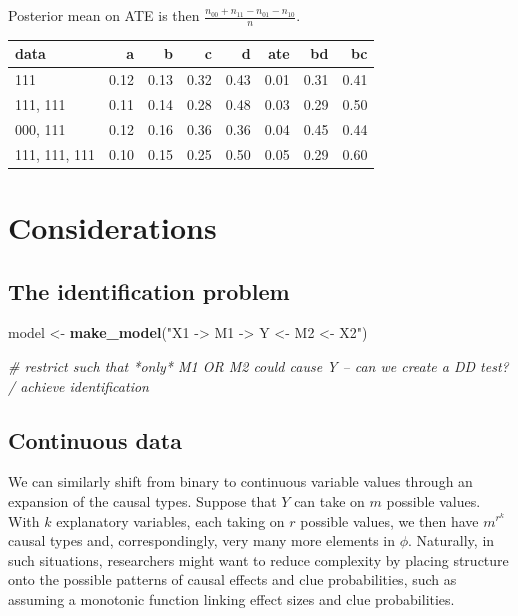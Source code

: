 \documentclass[
  12pt,
]{book}
\newenvironment{Shaded}{\begin{snugshade}}{\end{snugshade}}
\newcommand{\CommentTok}[1]{\textcolor[rgb]{0.56,0.35,0.01}{\textit{#1}}}
\newcommand{\KeywordTok}[1]{\textcolor[rgb]{0.13,0.29,0.53}{\textbf{#1}}}
\newcommand{\NormalTok}[1]{#1}
\newcommand{\StringTok}[1]{\textcolor[rgb]{0.31,0.60,0.02}{#1}}
\begin{document}
Posterior mean on ATE is then \(\frac{n_{00} + n_{11} - n_{01} - n_{10}}n\).

\begin{tabular}{l|r|r|r|r|r|r|r}
\hline
data & a & b & c & d & ate & bd & bc\\
\hline
111 & 0.12 & 0.13 & 0.32 & 0.43 & 0.01 & 0.31 & 0.41\\
\hline
111, 111 & 0.11 & 0.14 & 0.28 & 0.48 & 0.03 & 0.29 & 0.50\\
\hline
000, 111 & 0.12 & 0.16 & 0.36 & 0.36 & 0.04 & 0.45 & 0.44\\
\hline
111, 111, 111 & 0.10 & 0.15 & 0.25 & 0.50 & 0.05 & 0.29 & 0.60\\
\hline
\end{tabular}

\hypertarget{considerations}{%
\section{Considerations}\label{considerations}}

\hypertarget{the-identification-problem}{%
\subsection{The identification problem}\label{the-identification-problem}}

\begin{Shaded}
\begin{Highlighting}[]
\NormalTok{model <-}\StringTok{ }\KeywordTok{make_model}\NormalTok{(}\StringTok{"X1 -> M1 -> Y <- M2 <- X2"}\NormalTok{)}

\CommentTok{# restrict such that *only* M1 OR M2 could cause Y -- can we create a DD test? / achieve identification}
\end{Highlighting}
\end{Shaded}

\hypertarget{continuous-data}{%
\subsection{Continuous data}\label{continuous-data}}

We can similarly shift from binary to continuous variable values through an expansion of the causal types. Suppose that \(Y\) can take on \(m\) possible values. With \(k\) explanatory variables, each taking on \(r\) possible values, we then have \(m^{r^k}\) causal types and, correspondingly, very many more elements in \(\phi\). Naturally, in such situations, researchers might want to reduce complexity by placing structure onto the possible patterns of causal effects and clue probabilities, such as assuming a monotonic function linking effect sizes and clue probabilities.
\end{document}
